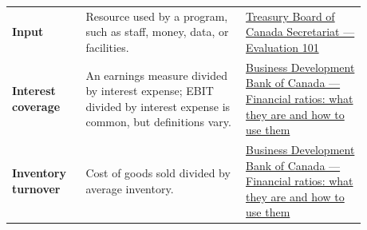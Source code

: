 \documentclass[11pt,letterpaper,oneside,openany]{book}
\begin{document}
\begin{center}
\begin{longtable}{>{\RaggedRight\arraybackslash}p{0.180\linewidth}>{\RaggedRight\arraybackslash}p{0.400\linewidth}>{\RaggedRight\arraybackslash}p{0.300\linewidth}}
\textbf{Input} & Resource used by a program, such as staff, money, data, or facilities. & \href{https://www.canada.ca/en/treasury-board-secretariat/services/audit-evaluation/evaluation-government-canada/evaluation-101-backgrounder.html}{Treasury Board of Canada Secretariat --- Evaluation 101} \\
\textbf{Interest coverage} & An earnings measure divided by interest expense; EBIT divided by interest expense is common, but definitions vary. & \href{https://www.bdc.ca/en/articles-tools/money-finance/manage-finances/financial-ratios-what-are-how-use}{Business Development Bank of Canada --- Financial ratios: what they are and how to use them} \\
\textbf{Inventory turnover} & Cost of goods sold divided by average inventory. & \href{https://www.bdc.ca/en/articles-tools/money-finance/manage-finances/financial-ratios-what-are-how-use}{Business Development Bank of Canada --- Financial ratios: what they are and how to use them} \\
\end{longtable}
\end{center}
\end{document}
